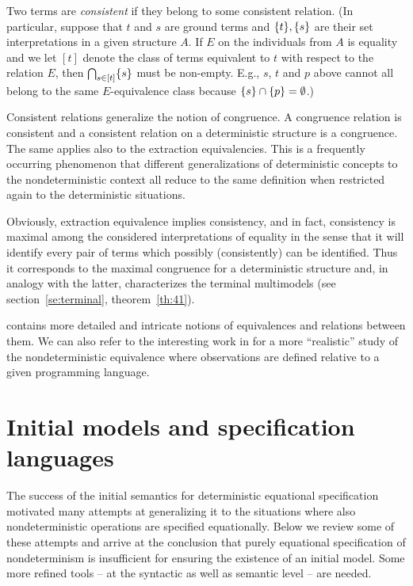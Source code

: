 {Two terms are {\em consistent} \cite{c:64, c:53} if they belong to some 
consistent relation. (In particular, 
suppose that $t$ and $s$ are ground terms and $\{t\}, \{s\}$ 
are their set interpretations in a given structure $A$. 
If $E$ on the individuals from $A$ is equality and we let 
$[t]$ denote the class of terms 
equivalent to $t$ with respect to the relation $E$, then 
$\bigcap_{s\in[t]}\{s\}$ must be non-empty.
E.g., $s$, $t$ and $p$ above cannot all 
belong to the same $E$-equivalence class because $\{s\} \cap \{p\} =\emptyset$.) 

Consistent relations
 generalize the notion of congruence. A congruence relation is 
consistent and a consistent relation on a deterministic structure is 
a congruence. The same applies also to the extraction equivalencies. 
This is a frequently occurring phenomenon that different generalizations 
of deterministic concepts to the nondeterministic 
context all reduce to the same definition when restricted again to 
the deterministic situations.

 Obviously, extraction equivalence implies 
consistency, and in fact, consistency is maximal 
among the considered interpretations of equality in the sense that it 
will identify every pair of terms which possibly (consistently) can 
be identified. Thus it corresponds to the maximal congruence for a 
deterministic structure and, in analogy with the latter, 
characterizes the terminal multimodels (see section~\ref{se:terminal}, theorem~\ref{th:41}). 

\cite{c:53} contains more detailed and intricate notions of equivalences and 
relations between them. We can also refer to the interesting work in 
\cite{c:93, c:94, c:95} for a more ``realistic'' study of the nondeterministic 
equivalence where observations are defined relative to a given 
programming language.


\section{Initial models and specification languages}\label{se:init}
The success of the initial semantics for deterministic equational 
specification motivated many attempts at 
generalizing it to the situations where also nondeterministic 
operations are specified equationally. 
Below 
we review some of these attempts and arrive at the conclusion that purely 
equational specification of 
nondeterminism is insufficient for ensuring the existence of an initial model. 
Some more refined tools -- at 
the syntactic as well as semantic level -- are needed.

}
